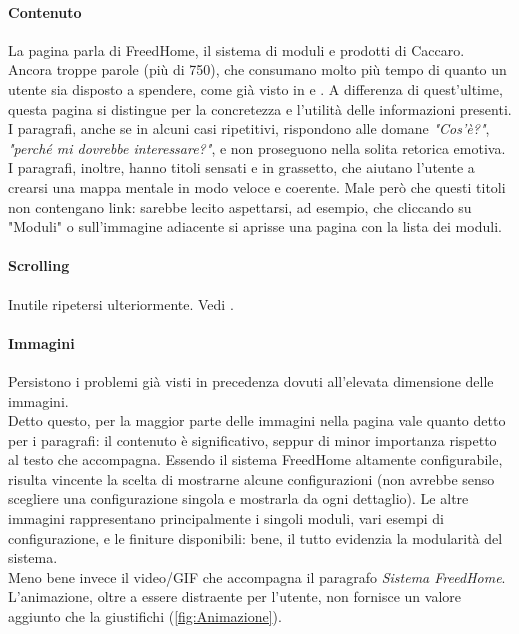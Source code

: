 \paragraph*{Contenuto}
La pagina parla di FreedHome, il sistema di moduli e prodotti di Caccaro. Ancora troppe parole (più di 750), che consumano molto più tempo di quanto un utente sia disposto a spendere, come già visto in  e . A differenza di quest'ultime, questa pagina si distingue per la concretezza e l'utilità delle informazioni presenti. I paragrafi, anche se in alcuni casi ripetitivi, rispondono alle domane \textit{"Cos'è?"}, \textit{"perché mi dovrebbe interessare?"}, e non proseguono nella solita retorica emotiva.\\
I paragrafi, inoltre, hanno titoli sensati e in grassetto, che aiutano l'utente a crearsi una mappa mentale in modo veloce e coerente. Male però che questi titoli non contengano link: sarebbe lecito aspettarsi, ad esempio, che cliccando su "Moduli" o sull'immagine adiacente si aprisse una pagina con la lista dei moduli.

\paragraph*{Scrolling}
Inutile ripetersi ulteriormente. Vedi .

\paragraph*{Immagini}
Persistono i problemi già visti in precedenza dovuti all'elevata dimensione delle immagini.\\
Detto questo, per la maggior parte delle immagini nella pagina vale quanto detto per i paragrafi: il contenuto è significativo, seppur di minor importanza rispetto al testo che accompagna. Essendo il sistema FreedHome altamente configurabile, risulta vincente la scelta di mostrarne alcune configurazioni (non avrebbe senso scegliere una configurazione singola e mostrarla da ogni dettaglio). Le altre immagini rappresentano principalmente i singoli moduli, vari esempi di configurazione, e le finiture disponibili: bene, il tutto evidenzia la modularità del sistema.\\
Meno bene invece il video/GIF che accompagna il paragrafo \textit{Sistema FreedHome}. L'animazione, oltre a essere distraente per l'utente, non fornisce un valore aggiunto che la giustifichi (\autoref{fig:Animazione}).

